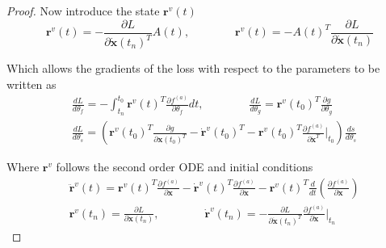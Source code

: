 \documentclass{article}
\theoremstyle{remark}
\theoremstyle{definition}
\begin{document}
\begin{proof}
Now introduce the state $\mathbf{r}^{v}(t)$
\begin{equation}
\mathbf{r}^{v}(t) = -\frac{\partial L}{\partial \dot{\mathbf{x}}(t_{n})^{T}}A(t),
\qquad\qquad
\mathbf{r}^{v}(t) = -A(t)^{T}\frac{\partial L}{\partial \dot{\mathbf{x}}(t_{n})}
\end{equation}

Which allows the gradients of the loss with respect to the parameters to be written as
\begin{equation}
\label{eqn: gradients_second_order_velocity}
\begin{aligned}
&\frac{dL}{d\theta_{f}} = -\int_{t_{n}}^{t_{0}}\mathbf{r}^{v}(t)^{T}\frac{\partial f^{(a)}}{\partial \theta_{f}}dt
,\qquad\qquad
\frac{dL}{d\theta_{g}} = \mathbf{r}^{v}(t_{0})^{T}\frac{\partial g}{\partial \theta_{g}}
\\
&\frac{dL}{d\theta_{s}} = \left(
\mathbf{r}^{v}(t_{0})^{T}\frac{\partial g}{\partial \mathbf{x}(t_{0})^{T}}
- \dot{\mathbf{r}}^{v}(t_{0})^{T} - \mathbf{r}^{v}(t_{0})^{T}
\frac{\partial f^{(a)}}{\partial \dot{\mathbf{x}}^{T}}\Biggr\vert_{t_{0}}
\right)\frac{ds}{d\theta_{s}}
\end{aligned}
\end{equation}

Where $\mathbf{r}^{v}$ follows the second order ODE and initial conditions
\begin{equation}
\label{eqn: d2adjdt2_velocity}
\begin{aligned}
&\ddot{\mathbf{r}}^{v}(t) = \mathbf{r}^{v}(t)^{T}\frac{\partial f^{(a)}}{\partial \mathbf{x}}
    -\dot{\mathbf{r}}^{v}(t)^{T}\frac{\partial f^{(a)}}{\partial \dot{\mathbf{x}}}
    - \mathbf{r}^{v}(t)^{T}\frac{d}{dt}
    \left(
    \frac{\partial f^{(a)}}{\partial \dot{\mathbf{x}}}
    \right)
    \\
    &\mathbf{r}^{v}(t_{n}) = \frac{\partial L}{\partial \dot{\mathbf{x}}(t_{n})}
    ,\qquad\qquad
    \dot{\mathbf{r}}^{v}(t_{n}) = -\frac{\partial L}{\partial \dot{\mathbf{x}}(t_{n})^{T}}
\frac{\partial f^{(a)}}{\partial \dot{\mathbf{x}}}\Biggr\vert_{t_{n}}
\end{aligned}
\end{equation}



\end{proof}
\end{document}
